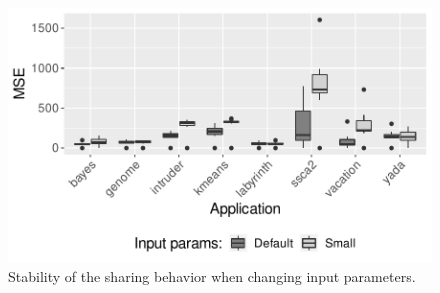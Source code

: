 \begin{figure}[!tb]
	\centering
	\includegraphics[width=\fullImageWidth\textwidth]{figures/sharingBehavior/SecondQ/0.graph.pdf}
	\caption{Stability of the sharing behavior when changing input parameters.}
	\label{fig:averageSecondQ}
\end{figure}

